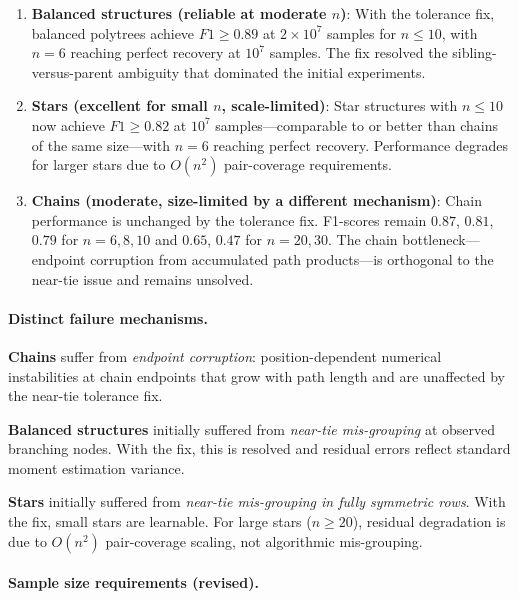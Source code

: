 \documentclass[11pt,a4paper]{article}
\numberwithin{equation}{section}
\begin{document}
\begin{enumerate}[label=(\arabic*)]
\item \textbf{Balanced structures (reliable at moderate $n$)}: With the tolerance fix,
balanced polytrees achieve $F1 \geq 0.89$ at $2 \times 10^7$ samples for $n \leq 10$,
with $n=6$ reaching perfect recovery at $10^7$ samples.  The fix resolved the
sibling-versus-parent ambiguity that dominated the initial experiments.

\item \textbf{Stars (excellent for small $n$, scale-limited)}: Star structures with
$n \leq 10$ now achieve $F1 \geq 0.82$ at $10^7$ samples---comparable to or better
than chains of the same size---with $n=6$ reaching perfect recovery.  Performance
degrades for larger stars due to $O(n^2)$ pair-coverage requirements.

\item \textbf{Chains (moderate, size-limited by a different mechanism)}: Chain
performance is unchanged by the tolerance fix.  F1-scores remain $0.87$, $0.81$,
$0.79$ for $n = 6, 8, 10$ and $0.65$, $0.47$ for $n = 20, 30$.  The chain
bottleneck---endpoint corruption from accumulated path products---is orthogonal to the
near-tie issue and remains unsolved.
\end{enumerate}

\paragraph{Distinct failure mechanisms.}

\textbf{Chains} suffer from \emph{endpoint corruption}: position-dependent numerical
instabilities at chain endpoints that grow with path length and are unaffected by the
near-tie tolerance fix.

\textbf{Balanced structures} initially suffered from \emph{near-tie mis-grouping} at
observed branching nodes.  With the fix, this is resolved and residual errors reflect
standard moment estimation variance.

\textbf{Stars} initially suffered from \emph{near-tie mis-grouping in fully symmetric
rows}.  With the fix, small stars are learnable.  For large stars ($n \geq 20$),
residual degradation is due to $O(n^2)$ pair-coverage scaling, not algorithmic
mis-grouping.

\paragraph{Sample size requirements (revised).}
\end{document}
